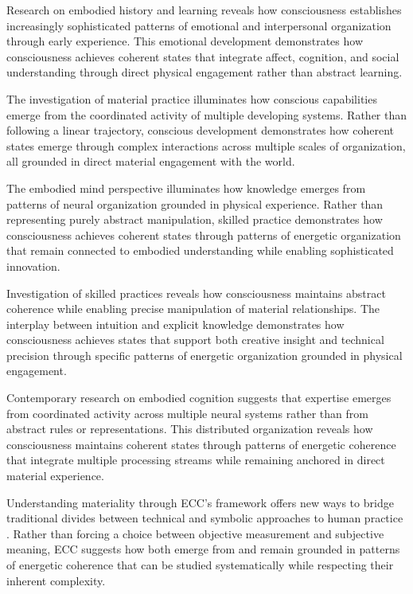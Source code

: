 Research on embodied history and learning \cite{toren1999mind} reveals how consciousness establishes increasingly sophisticated patterns of emotional and interpersonal organization through early experience. This emotional development demonstrates how consciousness achieves coherent states that integrate affect, cognition, and social understanding through direct physical engagement rather than abstract learning.

The investigation of material practice \cite{warnier2001praxeological} illuminates how conscious capabilities emerge from the coordinated activity of multiple developing systems. Rather than following a linear trajectory, conscious development demonstrates how coherent states emerge through complex interactions across multiple scales of organization, all grounded in direct material engagement with the world.

The embodied mind perspective \cite{csordas1990embodiment} illuminates how knowledge emerges from patterns of neural organization grounded in physical experience. Rather than representing purely abstract manipulation, skilled practice demonstrates how consciousness achieves coherent states through patterns of energetic organization that remain connected to embodied understanding while enabling sophisticated innovation.

Investigation of skilled practices \cite{marchand2010making} reveals how consciousness maintains abstract coherence while enabling precise manipulation of material relationships. The interplay between intuition and explicit knowledge demonstrates how consciousness achieves states that support both creative insight and technical precision through specific patterns of energetic organization grounded in physical engagement.

Contemporary research on embodied cognition \cite{jackson1989knowledge} suggests that expertise emerges from coordinated activity across multiple neural systems rather than from abstract rules or representations. This distributed organization reveals how consciousness maintains coherent states through patterns of energetic coherence that integrate multiple processing streams while remaining anchored in direct material experience.

Understanding materiality through ECC's framework offers new ways to bridge traditional divides between technical and symbolic approaches to human practice \cite{ingold2013making}. Rather than forcing a choice between objective measurement and subjective meaning, ECC suggests how both emerge from and remain grounded in patterns of energetic coherence that can be studied systematically while respecting their inherent complexity.

